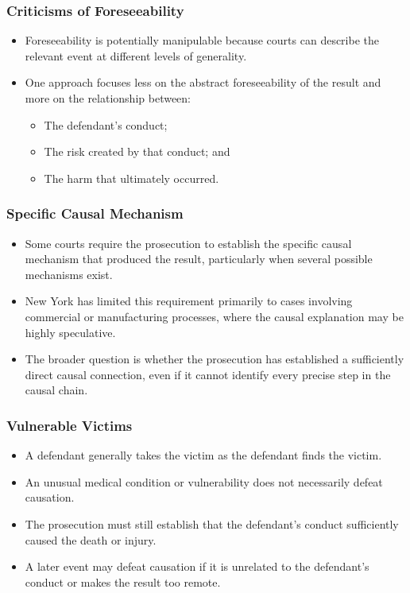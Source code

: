 \documentclass[11pt]{tex/lawoutline}
\begin{document}
\subsubsection{Criticisms of Foreseeability}{
\begin{itemize}
    \item Foreseeability is potentially manipulable because courts can describe the relevant event at different levels of generality.
    \item One approach focuses less on the abstract foreseeability of the result and more on the relationship between:
    \begin{itemize}
        \item The defendant's conduct;
        \item The risk created by that conduct; and
        \item The harm that ultimately occurred.
    \end{itemize}
\end{itemize}
}

\subsubsection{Specific Causal Mechanism}{
\begin{itemize}
    \item Some courts require the prosecution to establish the specific causal mechanism that produced the result, particularly when several possible mechanisms exist.
    \item New York has limited this requirement primarily to cases involving commercial or manufacturing processes, where the causal explanation may be highly speculative.
    \item The broader question is whether the prosecution has established a sufficiently direct causal connection, even if it cannot identify every precise step in the causal chain.
\end{itemize}
}

\subsubsection{Vulnerable Victims}{
\begin{itemize}
    \item A defendant generally takes the victim as the defendant finds the victim.
    \item An unusual medical condition or vulnerability does not necessarily defeat causation.
    \item The prosecution must still establish that the defendant's conduct sufficiently caused the death or injury.
    \item A later event may defeat causation if it is unrelated to the defendant's conduct or makes the result too remote.
\end{itemize}
}
\end{document}
